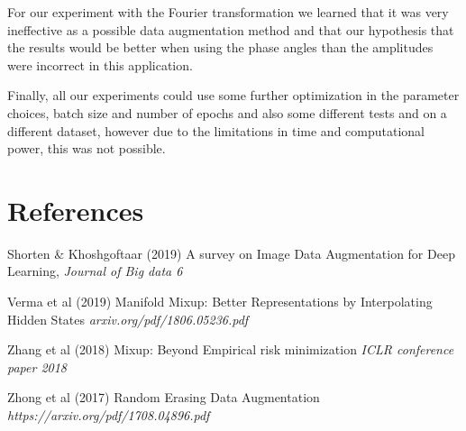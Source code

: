\documentclass{article}
\begin{document}
For our experiment with the Fourier transformation we learned that it was very ineffective as a possible data augmentation method and that our hypothesis 
that the results would be better when using the phase angles than the amplitudes were incorrect in this application. 

Finally, all our experiments could use some further optimization in the parameter choices, batch size and number of epochs and also some different tests and on a different dataset, however due to the limitations in time and computational power, this was not possible. 

\section*{References}

Shorten \& Khoshgoftaar (2019) A survey on Image Data Augmentation for Deep Learning, \textit{Journal of Big data 6}

Verma et al (2019) Manifold Mixup: Better Representations by Interpolating Hidden States \textit{arxiv.org/pdf/1806.05236.pdf}

Zhang et al (2018) Mixup: Beyond Empirical risk minimization \textit{ICLR conference paper 2018}

Zhong et al (2017) Random Erasing Data Augmentation \textit{https://arxiv.org/pdf/1708.04896.pdf}
\end{document}
